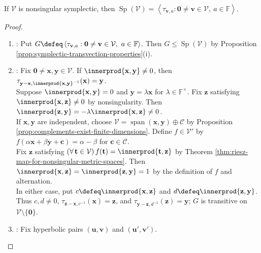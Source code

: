 \begin{theorem} \label{thm:symplectic-group-generated-by-transvections} \\
If $\mathcal{V}$ is nonsingular symplectic, then $\operatorname{Sp}(\mathcal{V})=\left\langle\tau_{\mathbf{v},a}:\mathbf{0}\neq\mathbf{v}\in\mathcal{V},\ a\in\mathbb{F}\right\rangle$.
\begin{proof}
\begin{enumerate}[label=(\roman*)]
\setlength{\itemsep}{0pt}
\item {}: Put $G\defeq\left\langle\tau_{\mathbf{v},a}:\mathbf{0}\neq\mathbf{v}\in\mathcal{V},\ a\in\mathbb{F}\right\rangle$. Then $G\leq\operatorname{Sp}(\mathcal{V})$ by Proposition \ref{prop:symplectic-transvection-properties}(i).
\item {}: Fix $\mathbf{0}\neq\mathbf{x},\mathbf{y}\in\mathcal{V}$. If $\innerprod{\mathbf{x},\mathbf{y}}\neq0$, then $\tau_{\mathbf{y}-\mathbf{x},\innerprod{\mathbf{x},\mathbf{y}}^{-1}}(\mathbf{x})=\mathbf{y}$.\\
Suppose $\innerprod{\mathbf{x},\mathbf{y}}=0$ and $\mathbf{y}=\lambda\mathbf{x}$ for $\lambda\in\mathbb{F}^{\times}$. Fix $\mathbf{z}$ satisfying $\innerprod{\mathbf{x},\mathbf{z}}\neq0$ by nonsingularity. Then $\innerprod{\mathbf{z},\mathbf{y}}=-\lambda\innerprod{\mathbf{x},\mathbf{z}}\neq0$.\\
If $\mathbf{x},\mathbf{y}$ are independent, choose $\mathcal{V}=\operatorname{span}(\mathbf{x},\mathbf{y})\oplus\mathcal{C}$ by Proposition \ref{prop:complements-exist-finite-dimensions}. Define $f\in\mathcal{V}'$ by $f(\alpha\mathbf{x}+\beta\mathbf{y}+\mathbf{c})=\alpha-\beta$ for $\mathbf{c}\in\mathcal{C}$.\\
Fix $\mathbf{z}$ satisfying $(\forall\,\mathbf{t}\in\mathcal{V})\,f(\mathbf{t})=\innerprod{\mathbf{t},\mathbf{z}}$ by Theorem \ref{thm:riesz-map-for-nonsingular-metric-spaces}. Then $\innerprod{\mathbf{x},\mathbf{z}}=\innerprod{\mathbf{z},\mathbf{y}}=1$ by the definition of $f$ and alternation.\\
In either case, put $c\defeq\innerprod{\mathbf{x},\mathbf{z}}$ and $d\defeq\innerprod{\mathbf{z},\mathbf{y}}$. Thus $c,d\neq0$, $\tau_{\mathbf{z}-\mathbf{x},c^{-1}}(\mathbf{x})=\mathbf{z}$, and $\tau_{\mathbf{y}-\mathbf{z},d^{-1}}(\mathbf{z})=\mathbf{y}$; $G$ is transitive on $\mathcal{V}\setminus\{\mathbf{0}\}$.
\item {}: Fix hyperbolic pairs $(\mathbf{u},\mathbf{v})$ and $(\mathbf{u}',\mathbf{v}')$.\\

\end{enumerate}
\end{proof}
\end{theorem}
